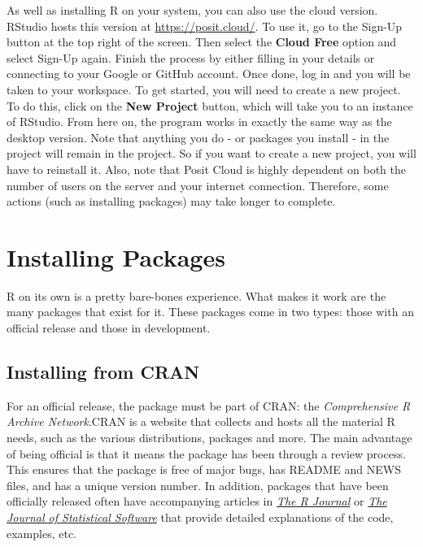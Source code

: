 \documentclass[
]{book}
\begin{document}
As well as installing R on your system, you can also use the cloud version. RStudio hosts this version at \url{https://posit.cloud/}. To use it, go to the Sign-Up button at the top right of the screen. Then select the \textbf{Cloud Free} option and select Sign-Up again. Finish the process by either filling in your details or connecting to your Google or GitHub account. Once done, log in and you will be taken to your workspace. To get started, you will need to create a new project. To do this, click on the \textbf{New Project} button, which will take you to an instance of RStudio. From here on, the program works in exactly the same way as the desktop version. Note that anything you do - or packages you install - in the project will remain in the project. So if you want to create a new project, you will have to reinstall it. Also, note that Posit Cloud is highly dependent on both the number of users on the server and your internet connection. Therefore, some actions (such as installing packages) may take longer to complete.

\chapter{Installing Packages}\label{installing-packages}

R on its own is a pretty bare-bones experience. What makes it work are the many packages that exist for it. These packages come in two types: those with an official release and those in development.

\section{Installing from CRAN}\label{installing-from-cran}

For an official release, the package must be part of CRAN: the \emph{Comprehensive R Archive Network}.CRAN is a website that collects and hosts all the material R needs, such as the various distributions, packages and more. The main advantage of being official is that it means the package has been through a review process. This ensures that the package is free of major bugs, has README and NEWS files, and has a unique version number. In addition, packages that have been officially released often have accompanying articles in \href{https://www.https://journal.r-project.org/}{\emph{The R Journal}} or \href{https://www.jstatsoft.org/index}{\emph{The Journal of Statistical Software}} that provide detailed explanations of the code, examples, etc.
\end{document}
